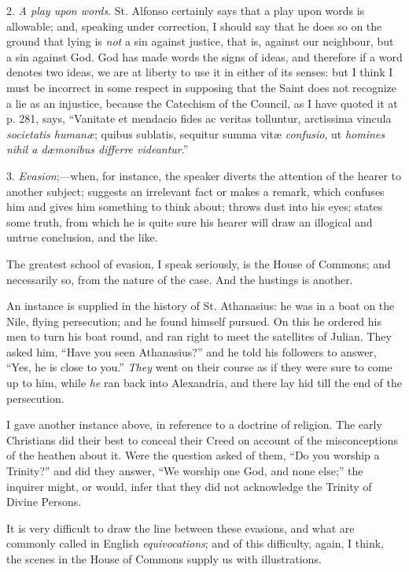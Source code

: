 2. \emph{A play upon words}. St. Alfonso certainly says that a play
upon words is allowable; and, speaking under correction, I should say
that he does so on the ground that lying is \emph{not} a sin against
justice, that is, against our neighbour, but a sin against God. God has
made
words the signs of ideas, and therefore if a word denotes
two ideas, we are at liberty to use it in either of its senses: but
I
think I must be incorrect in some respect in supposing that
the Saint does not recognize a lie as an injustice, because the
Catechism of the Council, as I have quoted it at p. 281, says, ``Vanitate
et mendacio fides ac veritas tolluntur, arctissima vincula \emph{societatis
humanæ}; quibus sublatis, sequitur summa vitæ \emph{confusio}, ut \emph{homines
nihil a dæmonibus differre videantur}.''

3. \emph{Evasion};—when, for instance, the speaker diverts the
attention of the hearer to another subject; suggests an irrelevant fact
or makes a remark, which confuses him and gives him something to
think about; throws dust into his eyes; states some truth, from which he
is quite sure his hearer will draw an illogical and untrue conclusion,
and the like.

The greatest school of evasion, I speak seriously, is the House of
Commons; and necessarily so, from the nature of the case. And the
hustings is another.

An instance is supplied in the history of St. Athanasius: he was in a
boat on the Nile, flying persecution; and he found himself pursued. On
this he ordered his men to turn his boat round, and ran right to meet
the satellites of Julian. They asked him, ``Have you seen Athanasius?'' and
he told his followers to answer, ``Yes, he is close to you.'' \emph{They}
went on their course as if they were sure to come up to him, while \emph{he} ran
back into Alexandria, and there lay hid
till the end of the persecution.

I gave another instance above, in reference to a doctrine of
religion. The early Christians did their best to conceal their Creed on
account of the misconceptions of the heathen about it. Were the question
asked of them, ``Do you worship a Trinity?'' and did they
answer, ``We worship one God, and none else;'' the inquirer
might, or would, infer that they did not acknowledge the Trinity of
Divine Persons.

It is very difficult to draw the line between these evasions, and
what are commonly called in English \emph{equivocations}; and of this
difficulty, again, I think, the scenes in the House of Commons supply us
with illustrations.


